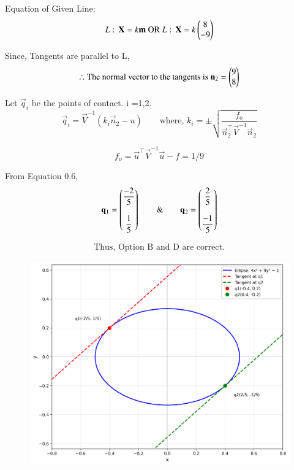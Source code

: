 \documentclass[journal]{IEEEtran}
\begin{document}
Equation of Given Line:
\begin{equation}
     L: \, \mathbf{X} = k\mathbf{m} \text{  OR  } L: \, \mathbf{X} = k\begin{pmatrix}8 \\ -9\end{pmatrix}
\end{equation}

Since, Tangents are parallel to L,
\begin{equation}
    \therefore \text{The normal vector to the tangents is } \mathbf{n}_2 = \begin{pmatrix}9 \\ 8\end{pmatrix}
\end{equation}

Let $\vec{q}_i$ be the points of contact. i =1,2.
\begin{equation}
    \vec{q}_i = \vec{V}^{-1}(k_i\vec{n}_2 - u) \qquad
    \text{where, } k_i = \pm \sqrt{\dfrac{f_o}{\vec{n}_2^\top \vec{V}^{-1} \vec{n}_2}}
\end{equation}

\begin{equation}
    f_o = \vec{u}^\top\vec{V}^{-1}\vec{u} - f = 1/9
\end{equation}

From Equation 0.6,
\begin{equation}
    \mathbf{q}_1 = \begin{pmatrix}\dfrac{-2}{5} \\\\ \dfrac{1}{5}\end{pmatrix} \qquad \& \qquad \mathbf{q}_2 = \begin{pmatrix}\dfrac{2}{5} \\\\ \dfrac{-1}{5}\end{pmatrix}
\end{equation}


\begin{align*}
    \boxed{\text{Thus, Option B and D are correct.}}
\end{align*}



\begin{figure}[htbp]
    \centering
\includegraphics[width=\columnwidth]{figs/fig1.png}
    \caption{}
    \label{fig:figs/fig1.png}
\end{figure}
\end{document}
